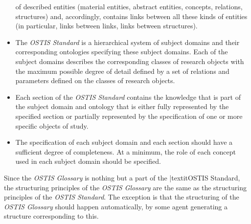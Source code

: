 \documentclass[10 pt]{extarticle}
\begin{document}
\begin{multicols}{2}
\begin{itemize}
of described entities (material entities, abstract entities, concepts, relations, structures) and, accordingly,
contains links between all these kinds of entities
(in particular, links between links, links between
structures).
    \item The \textit{OSTIS Standard} is a hierarchical system of
subject domains and their corresponding ontologies
specifying these subject domains. Each of the subject domains describes the corresponding classes of
research objects with the maximum possible degree
of detail defined by a set of relations and parameters
defined on the classes of research objects.
    \item Each section of the \textit{OSTIS Standard} contains the
knowledge that is part of the subject domain and
ontology that is either fully represented by the
specified section or partially represented by the
specification of one or more specific objects of
study.
    \item The specification of each subject domain and each
section should have a sufficient degree of completeness. At a minimum, the role of each concept used
in each subject domain should be specified.
\end{itemize}

Since the \textit{OSTIS Glossary} is nothing but a part of the
|textit{OSTIS Standard}, the structuring principles of the \textit{OSTIS
Glossary} are the same as the structuring principles of
the \textit{OSTIS Standard}. The exception is that the structuring
of the \textit{OSTIS Glossary} should happen automatically, by
some agent generating a structure corresponding to this.

\end{multicols}
\end{document}
